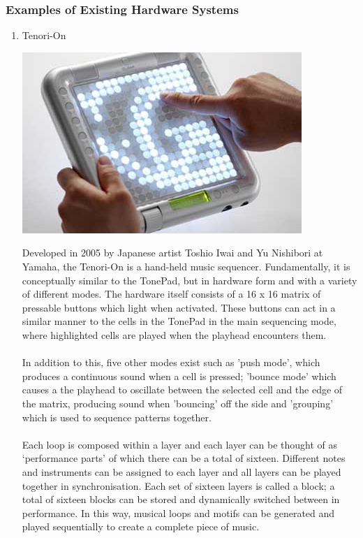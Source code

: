 \documentclass[10pt,a4paper]{article}
\begin{document}
\subsubsection{Examples of Existing Hardware Systems}
\begin{enumerate}
\item Tenori-On
\begin{center}
\includegraphics[scale=0.5]{3.jpg}\
\end{center}
Developed in 2005 by Japanese artist Toshio Iwai and Yu Nishibori at Yamaha\cite{tenorionwiki}, the Tenori-On is a hand-held music sequencer. Fundamentally, it is conceptually similar to the TonePad, but in hardware form and with a variety of different modes. The hardware itself consists of a 16 x 16 matrix of pressable buttons which light when activated. These buttons can act in a similar manner to the cells in the TonePad in the main sequencing mode, where highlighted cells are played when the playhead encounters them.\\
\\
In addition to this, five other modes exist such as 'push mode', which produces a continuous sound when a cell is pressed; 'bounce mode' which causes a the playhead to oscillate between the selected cell and the edge of the matrix, producing sound when 'bouncing' off the side and 'grouping' which is used to sequence patterns together.\\
\\
Each loop is composed within a layer and each layer can be thought of as `performance parts' of which there can be a total of sixteen. Different notes and instruments can be assigned to each layer and all layers can be played together in synchronisation. Each set of sixteen layers is called a block; a total of sixteen blocks can be stored and dynamically switched between in performance. In this way, musical loops and motifs can be generated and played sequentially to create a complete piece of music\cite{tenorionyamaha}.


\end{enumerate}
\end{document}
